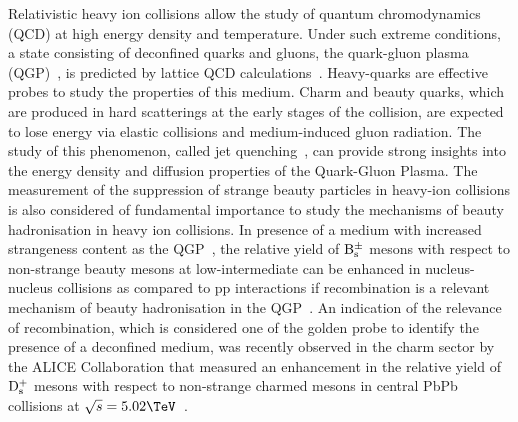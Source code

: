 
\maketitle

Relativistic heavy ion collisions allow the study of quantum chromodynamics (QCD) at high energy density and temperature. Under such extreme conditions, a state consisting of deconfined 
quarks and gluons, the quark-gluon plasma (QGP)~\cite{QGP1,QGP2}, is predicted by lattice QCD calculations~\cite{Karsch:2003jg}. Heavy-quarks are effective probes to study the 
properties of this medium. Charm and beauty quarks, which are produced in hard scatterings at the early stages of the collision, are expected to lose energy via elastic collisions and 
medium-induced gluon radiation. The study of this phenomenon, called jet quenching~\cite{Eloss1,Baier:2000mf,Chatrchyan:2011sx,Aad:2010bu}, can provide strong insights into the 
energy density and diffusion properties of the Quark-Gluon Plasma.  The measurement of the suppression of strange beauty particles in heavy-ion collisions is 
also considered of fundamental importance to study the mechanisms of beauty hadronisation in heavy ion collisions. In presence of a medium with increased strangeness content 
as the QGP~\cite{ABELEV:2013zaa}, the relative yield of $\rm B_{\rm s }^{\pm}$ mesons with respect to non-strange beauty mesons at low-intermediate \pt can be enhanced in nucleus-nucleus 
collisions as compared to pp interactions if recombination is a relevant mechanism of beauty hadronisation in the QGP~\cite{Molnar:2003ff,Greco:2003mm,Greco:2003vf}. 
An indication of the relevance of recombination, which is considered one of the golden probe to identify the presence of a deconfined medium, was recently observed in the charm sector by the ALICE 
Collaboration that measured an enhancement in the relative yield of $\rm D_{\rm s }^{+}$ mesons with respect to non-strange charmed mesons in central PbPb collisions at $\sqrts=5.02\TeV$~\cite{Adam2016Ds}.

